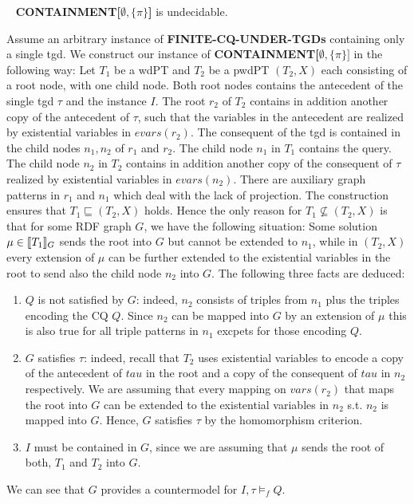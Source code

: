 \begin{theorem}\label{cemptypi}~\cite{pichler2014containment}
	\textbf{CONTAINMENT[$\emptyset,\{\pi\}$]} is undecidable.
\end{theorem}
\begin{proofidea}
	Assume an arbitrary instance of \textbf{FINITE-CQ-UNDER-TGDs} containing only a
	single tgd. We construct our instance of
	\textbf{CONTAINMENT[$\emptyset,\{\pi\}]$} in the following way:
	Let $T_1$ be a wdPT and $T_2$ be a pwdPT $(T_2,X)$ each consisting of a root
	node, with one child node. Both root nodes contains the antecedent of the
	single tgd $\tau$ and the instance $I$.
	The root $r_2$ of $T_2$ contains in addition another copy of the antecedent
	of $\tau$, such that the variables in the antecedent are realized by
	existential variables in $evars(r_2)$.
	The consequent of the tgd is contained in the child nodes $n_1,n_2$ of $r_1$ and
	$r_2$. The child node $n_1$ in $T_1$ contains the query. The child node
	$n_2$ in $T_2$ contains in addition another copy of the consequent of $\tau$
	realized by existential variables in $evars(n_2)$.
	There are auxiliary graph patterns in $r_1$ and $n_1$ which deal with the
	lack of projection. 
	The construction ensures that $T_1 \sqsubseteq(T_2,X)$ holds. 
	Hence the only reason for $T_1 \not\subseteq (T_2,X)$ is that for some RDF
	graph $G$, we have the following situation: Some solution $\mu \in \llbracket
	T_1\rrbracket_G$ sends the root into $G$ but cannot be extended to $n_1$, while in
	$(T_2,X)$ every extension of $\mu$ can be further extended to the existential 
	variables in the root
	to send also the child node $n_2$ into $G$.
	The following three facts are deduced:
	\begin{enumerate}
		\item $Q$ is not satisfied by $G$: indeed, $n_2$ consists of triples from
			$n_1$ plus the triples encoding the CQ $Q$. Since $n_2$ can be
			mapped into $G$ by an extension of $\mu$ this is also true for all
			triple patterns in $n_1$ excpets for those encoding $Q$.
		\item $G$ satisfies $\tau$: indeed, recall that $T_2$ uses existential
			variables to encode a copy of the antecedent of $tau$ in the root
			and a copy of the consequent of $tau$ in $n_2$ respectively. We are
			assuming that every mapping on $vars(r_2)$ that maps the root into
			$G$ can be extended to the existential variables in $n_2$ s.t. $n_2$
			is mapped into $G$. Hence, $G$ satisfies $\tau$ by the homomorphism
			criterion.
		\item $I$ must be contained in $G$, since we are assuming that $\mu$
			sends the root of both, $T_1$ and $T_2$ into $G$.
	\end{enumerate}
	We can see that $G$ provides a countermodel for $I,\tau \models_f Q$.
\end{proofidea}

